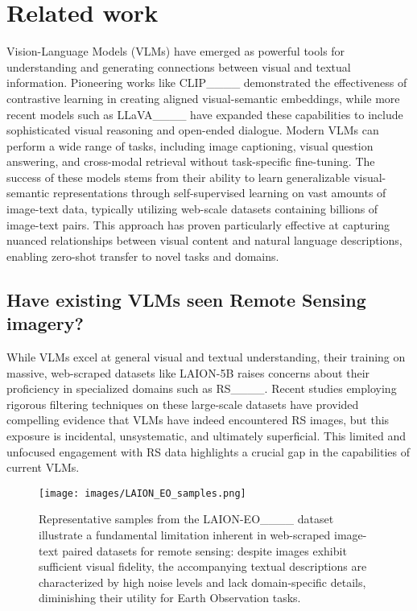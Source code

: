 \section{Related work}
Vision-Language Models (VLMs) have emerged as powerful tools for understanding and generating connections between visual and textual information. Pioneering works like CLIP____ demonstrated the effectiveness of contrastive learning in creating aligned visual-semantic embeddings, while more recent models such as LLaVA____ have expanded these capabilities to include sophisticated visual reasoning and open-ended dialogue. Modern VLMs can perform a wide range of tasks, including image captioning, visual question answering, and cross-modal retrieval without task-specific fine-tuning. The success of these models stems from their ability to learn generalizable visual-semantic representations through self-supervised learning on vast amounts of image-text data, typically utilizing web-scale datasets containing billions of image-text pairs. This approach has proven particularly effective at capturing nuanced relationships between visual content and natural language descriptions, enabling zero-shot transfer to novel tasks and domains.

\subsection{Have existing VLMs seen Remote Sensing imagery?} \label{sec:seen_rs}
While VLMs excel at general visual and textual understanding, their training on massive, web-scraped datasets like LAION-5B raises concerns about their proficiency in specialized domains such as RS____. Recent studies employing rigorous filtering techniques on these large-scale datasets have provided compelling evidence that VLMs have indeed encountered RS images, but this exposure is incidental, unsystematic, and ultimately superficial. This limited and unfocused engagement with RS data highlights a crucial gap in the capabilities of current VLMs.

\begin{figure*}
\centering
\texttt{[image: images/LAION\_EO\_samples.png]}
\caption{Representative samples from the LAION-EO____ dataset illustrate a fundamental limitation inherent in web-scraped image-text paired datasets for remote sensing: despite images exhibit sufficient visual fidelity, the accompanying textual descriptions are characterized by high noise levels and lack domain-specific details, diminishing their utility for Earth Observation tasks.}
\label{fig:laion_samples}
\end{figure*}

